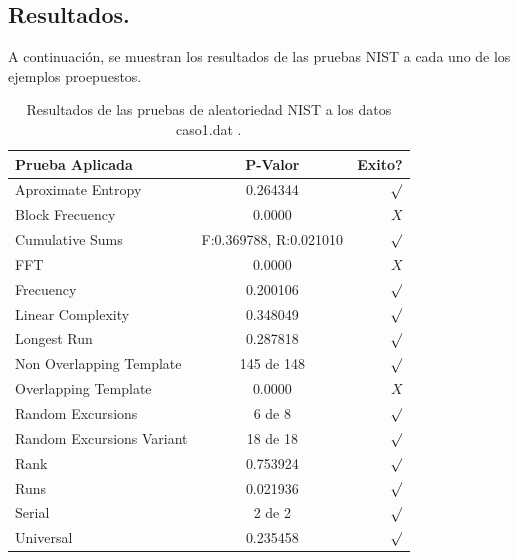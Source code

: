 \documentclass[10pt]{IEEEtran}
\begin{document}
\subsection{Resultados.}

A continuación, se muestran los resultados de las pruebas NIST a cada uno de los ejemplos proepuestos.




\begin{table}[H]
\caption{Resultados de las pruebas de aleatoriedad NIST a los datos caso1.dat .}
\label{caso1}
\begin{center}
\begin{small}
\begin{tabular}{|l|c|r|}
\hline

Prueba Aplicada &  P-Valor & Exito? \\
\hline

Aproximate Entropy    &   0.264344  & $\surd$ \\

Block Frecuency  & 0.0000  &  $X$  \\

Cumulative Sums    &   F:0.369788, R:0.021010  & $\surd$ \\

FFT    &   0.0000 &   $X$      \\

Frecuency     &  0.200106 &  $\surd$   \\

Linear Complexity      & 0.348049 & $\surd$ \\

Longest Run      &   0.287818 &    $\surd$      \\

Non Overlapping Template      & 145 de 148    &     $\surd$          \\

Overlapping Template      &  0.0000  &        $X$       \\

Random Excursions      & 6 de 8  &    $\surd$      \\

Random Excursions Variant & 18 de 18 &     $\surd$    \\

Rank &  0.753924 &      $\surd$      \\

Runs &    0.021936 &     $\surd$        \\

Serial &     2 de 2    &     $\surd$        \\

Universal &      0.235458   &   $\surd$            \\

\hline

\end{tabular}
\end{small}
\end{center}
\end{table}
\end{document}
